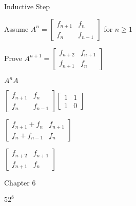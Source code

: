\documentclass{exam}
\begin{document}
\begin{questions}
\begin{center}
\vspace{5px}

Inductive Step

Assume 
\( A^n =
\begin{bmatrix}
f_{n+1} & f_{n}\\
f_{n} & f_{n-1}
\end{bmatrix}
\) for \(n \geq 1\)

Prove 
\( A^{n+1} =
\begin{bmatrix}
f_{n+2} & f_{n+1}\\
f_{n+1} & f_{n}
\end{bmatrix}
\)

\(A^{n} A\)

\(
\begin{bmatrix}
f_{n+1} & f_{n}\\
f_{n} & f_{n-1}
\end{bmatrix}
\begin{bmatrix}
1 & 1\\
1 & 0
\end{bmatrix}
\)

\(
\begin{bmatrix}
f_{n+1} + f_{n} & f_{n+1}\\
f_{n} + f_{n-1} & f_{n}
\end{bmatrix}
\)

\(
\begin{bmatrix}
f_{n+2} & f_{n+1}\\
f_{n+1} & f_{n}
\end{bmatrix}
\)

\end{center}

\newpage




\vspace{10pt}
{\Large Chapter 6}
\vspace{2pt}

\begin{subparts}

\begin{center}

\( 52^8 \)


\end{center}
\end{subparts}
\end{questions}
\end{document}
